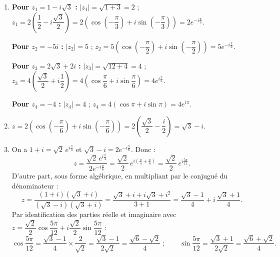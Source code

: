 \documentclass[11pt]{article}
\begin{document}
\begin{corrige}
\begin{enumerate}
\item \textbf{Pour $z_1 = 1 - i\sqrt{3}$ :} $|z_1| = \sqrt{1 + 3} = 2$ ; $z_1 = 2\left(\dfrac{1}{2} - i\dfrac{\sqrt{3}}{2}\right) = 2\left(\cos\left(-\dfrac{\pi}{3}\right) + i\sin\left(-\dfrac{\pi}{3}\right)\right) = 2e^{-i\frac{\pi}{3}}$.

\textbf{Pour $z_2 = -5i$ :} $|z_2| = 5$ ; $z_2 = 5\left(\cos\left(-\dfrac{\pi}{2}\right) + i\sin\left(-\dfrac{\pi}{2}\right)\right) = 5e^{-i\frac{\pi}{2}}$.

\textbf{Pour $z_3 = 2\sqrt{3} + 2i$ :} $|z_3| = \sqrt{12 + 4} = 4$ ; $z_3 = 4\left(\dfrac{\sqrt{3}}{2} + i\dfrac{1}{2}\right) = 4\left(\cos\dfrac{\pi}{6} + i\sin\dfrac{\pi}{6}\right) = 4e^{i\frac{\pi}{6}}$.

\textbf{Pour $z_4 = -4$ :} $|z_4| = 4$ ; $z_4 = 4(\cos\pi + i\sin\pi) = 4e^{i\pi}$.
\item $z = 2\left(\cos\left(-\dfrac{\pi}{6}\right) + i\sin\left(-\dfrac{\pi}{6}\right)\right) = 2\left(\dfrac{\sqrt{3}}{2} - \dfrac{i}{2}\right) = \sqrt{3} - i$.
\item On a $1 + i = \sqrt{2}\,e^{i\frac{\pi}{4}}$ et $\sqrt{3} - i = 2e^{-i\frac{\pi}{6}}$. Donc :
\[ z = \frac{\sqrt{2}\,e^{i\frac{\pi}{4}}}{2e^{-i\frac{\pi}{6}}} = \frac{\sqrt{2}}{2}\,e^{i\left(\frac{\pi}{4} + \frac{\pi}{6}\right)} = \frac{\sqrt{2}}{2}\,e^{i\frac{5\pi}{12}}. \]
D'autre part, sous forme algébrique, en multipliant par le conjugué du dénominateur :
\[ z = \frac{(1 + i)(\sqrt{3} + i)}{(\sqrt{3} - i)(\sqrt{3} + i)} = \frac{\sqrt{3} + i + i\sqrt{3} + i^2}{3 + 1} = \frac{\sqrt{3} - 1}{4} + i\,\frac{\sqrt{3} + 1}{4}. \]
Par identification des parties réelle et imaginaire avec $z = \dfrac{\sqrt{2}}{2}\cos\dfrac{5\pi}{12} + i\dfrac{\sqrt{2}}{2}\sin\dfrac{5\pi}{12}$ :
\[ \cos\frac{5\pi}{12} = \frac{\sqrt{3} - 1}{4} \times \frac{2}{\sqrt{2}} = \frac{\sqrt{3} - 1}{2\sqrt{2}} = \frac{\sqrt{6} - \sqrt{2}}{4} \;; \qquad \sin\frac{5\pi}{12} = \frac{\sqrt{3} + 1}{2\sqrt{2}} = \frac{\sqrt{6} + \sqrt{2}}{4}. \]
\end{enumerate}
\end{corrige}
\end{document}
